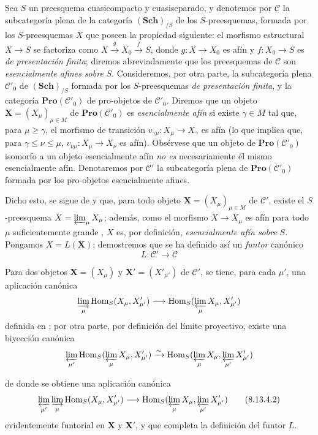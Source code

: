 \begin{env}[8.13.4]
\label{IV.8.13.4}
Sea $S$ un preesquema cuasicompacto y cuasiseparado, y denotemos por $\mathcal{C}$ la subcategoría plena de la categoría $(\mathbf{Sch})_{/S}$ de los $S$-preesquemas, formada por los $S$-preesquemas $X$ que poseen la propiedad siguiente: el morfismo estructural $X\to S$ se factoriza como $X\xrightarrow{g}X_0\xrightarrow{f}S$, donde $g:X\to X_0$ es afín y $f:X_0\to S$ es \emph{de presentación finita}; diremos abreviadamente que los preesquemas de $\mathcal{C}$ son \emph{esencialmente afines sobre} $S$.
Consideremos, por otra parte, la subcategoría plena $\mathcal{C}'_0$ de $(\mathbf{Sch})_{/S}$ formada por los $S$-preesquemas \emph{de presentación finita}, y la categoría $\mathbf{Pro}(\mathcal{C}'_0)$ de pro-objetos de $\mathcal{C}'_0$.
Diremos que un objeto $\mathbf{X}=(X_\mu)_{\mu\in M}$ de $\mathbf{Pro}(\mathcal{C}'_0)$ es \emph{esencialmente afín} si existe $\gamma\in M$ tal que, para $\mu\geqslant\gamma$, el morfismo de transición $v_{\gamma\mu}:X_\mu\to X_\gamma$ es afín (lo que implica que, para $\gamma\leqslant\nu\leqslant\mu$, $v_{\nu\mu}:X_\mu\to X_\nu$ es afín).
Obsérvese que un objeto de $\mathbf{Pro}(\mathcal{C}'_0)$ isomorfo a un objeto esencialmente afín \emph{no es} necesariamente él mismo esencialmente afín.
Denotaremos por $\mathcal{C}'$ la subcategoría plena de $\mathbf{Pro}(\mathcal{C}'_0)$ formada por los pro-objetos esencialmente afines.

Dicho esto, se sigue de  y  que, para todo objeto $\mathbf{X}=(X_\mu)_{\mu\in M}$ de $\mathcal{C}'$, existe el $S$-preesquema $X=\varprojlim_\mu X_\mu$; además, como el morfismo $X\to X_\mu$ es afín para todo $\mu$ suficientemente grande , $X$ es, por definición, \emph{esencialmente afín sobre} $S$.
Pongamos $X=L(\mathbf{X})$; demostremos que se ha definido así un \emph{funtor} canónico
\begin{equation}
\label{IV.8.13.4.1}
L:\mathcal{C}'\to\mathcal{C} \tag{8.13.4.1}
\end{equation}

Para dos objetos $\mathbf{X}=(X_\mu)$ y $\mathbf{X}'=(X'_{\mu'})$ de $\mathcal{C}'$, se tiene, para cada $\mu'$, una aplicación canónica
\[
\varinjlim_\mu\operatorname{Hom}_S(X_\mu,X'_{\mu'})\to\operatorname{Hom}_S(\varprojlim_\mu X_\mu,X'_{\mu'})
\]
definida en ; por otra parte, por definición del límite proyectivo, existe una biyección canónica
\[
\varprojlim_{\mu'}\operatorname{Hom}_S(\varprojlim_\mu X_\mu,X'_{\mu'})\xrightarrow{\sim}\operatorname{Hom}_S(\varprojlim_\mu X_\mu,\varprojlim_{\mu'}X'_{\mu'})
\]

de donde se obtiene una aplicación canónica
\begin{equation}
\label{IV.8.13.4.2}
\varprojlim_{\mu'}\varinjlim_\mu\operatorname{Hom}_S(X_\mu,X'_{\mu'})\to\operatorname{Hom}_S(\varprojlim_\mu X_\mu,\varprojlim_{\mu'}X'_{\mu'}) \tag{8.13.4.2}
\end{equation}
evidentemente funtorial en $\mathbf{X}$ y $\mathbf{X}'$, y que completa la definición del funtor $L$.
\end{env}

